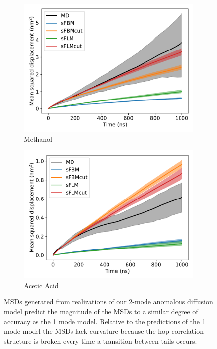 \documentclass{article}
\begin{document}
\begin{figure}
\begin{subfigure}{0.45\textwidth}
  \includegraphics[width=\textwidth]{2mode_msd_comparison_MET.pdf}
  \caption{Methanol}\label{fig:2mode_msd_comparison_MET}
  \end{subfigure}
  \begin{subfigure}{0.45\textwidth}
  \includegraphics[width=\textwidth]{2mode_msd_comparison_ACH.pdf}
  \caption{Acetic Acid}\label{fig:2mode_msd_comparison_ACH}
  \end{subfigure}
  \caption{MSDs generated from realizations of our 2-mode anomalous diffusion model
  predict the magnitude of the MSDs to a similar degree of accuracy as the 1 mode
  model. Relative to the predictions of the 1 mode model the MSDs lack curvature because
  the hop correlation structure is broken every time a transition between tails occurs.}\label{fig:anomalous_msds_2mode}
  \end{figure}
  
\end{document}
